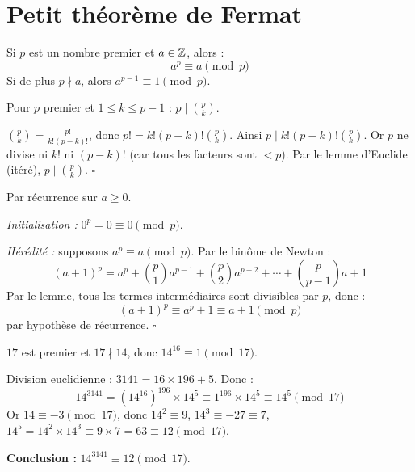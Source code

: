\section{Petit théorème de Fermat}

\begin{thmbox}
Si $p$ est un nombre premier et $a \in \mathbb{Z}$, alors :
\[
  a^p \equiv a \pmod{p}
\]
Si de plus $p \nmid a$, alors $a^{p-1} \equiv 1 \pmod{p}$.
\end{thmbox}

\begin{lemme}
Pour $p$ premier et $1 \leqslant k \leqslant p-1$ : $p \;\Big|\; \binom{p}{k}$.
\end{lemme}

\begin{proofbox}
$\binom{p}{k} = \frac{p!}{k!(p-k)!}$, donc $p! = k!(p-k)!\binom{p}{k}$. Ainsi $p \mid k!(p-k)!\binom{p}{k}$. Or $p$ ne divise ni $k!$ ni $(p-k)!$ (car tous les facteurs sont $< p$). Par le lemme d'Euclide (itéré), $p \mid \binom{p}{k}$. \hfill$\square$
\end{proofbox}

\begin{proofbox}
Par récurrence sur $a \geqslant 0$.

\textit{Initialisation :} $0^p = 0 \equiv 0 \pmod{p}$. \checkmark

\textit{Hérédité :} supposons $a^p \equiv a \pmod{p}$. Par le binôme de Newton :
\[
  (a+1)^p = a^p + \binom{p}{1}a^{p-1} + \binom{p}{2}a^{p-2} + \cdots + \binom{p}{p-1}a + 1
\]
Par le lemme, tous les termes intermédiaires sont divisibles par $p$, donc :
\[
  (a+1)^p \equiv a^p + 1 \equiv a + 1 \pmod{p}
\]
par hypothèse de récurrence. \hfill$\square$
\end{proofbox}

\begin{exbox}
$17$ est premier et $17 \nmid 14$, donc $14^{16} \equiv 1 \pmod{17}$.

Division euclidienne : $3141 = 16 \times 196 + 5$. Donc :
\[
  14^{3141} = (14^{16})^{196} \times 14^5 \equiv 1^{196} \times 14^5 \equiv 14^5 \pmod{17}
\]
Or $14 \equiv -3 \pmod{17}$, donc $14^2 \equiv 9$, $14^3 \equiv -27 \equiv 7$, $14^5 = 14^2 \times 14^3 \equiv 9 \times 7 = 63 \equiv 12 \pmod{17}$.

\textbf{Conclusion :} $14^{3141} \equiv 12 \pmod{17}$.
\end{exbox}

